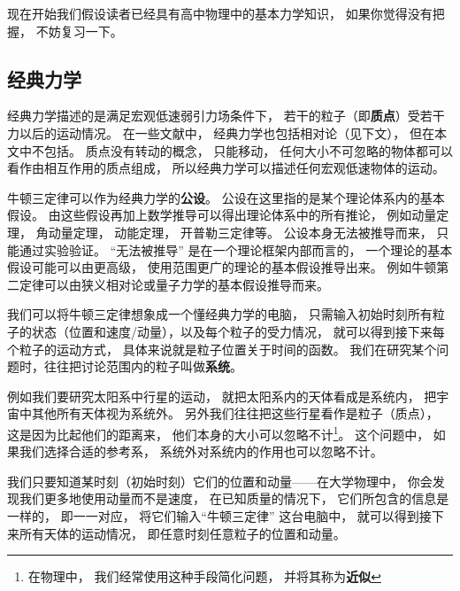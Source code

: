 
\begin{issues}
\issueTODO
\end{issues}


现在开始我们假设读者已经具有高中物理中的基本力学知识， 如果你觉得没有把握， 不妨复习一下。

\subsection{经典力学}
经典力学描述的是满足宏观低速弱引力场条件下， 若干的粒子（即\textbf{质点}）受若干力以后的运动情况。 在一些文献中， 经典力学也包括相对论（见下文）， 但在本文中不包括。 质点没有转动的概念， 只能移动， 任何大小不可忽略的物体都可以看作由相互作用的质点组成， 所以经典力学可以描述任何宏观低速物体的运动。

牛顿三定律可以作为经典力学的\textbf{公设}。 公设在这里指的是某个理论体系内的基本假设。 由这些假设再加上数学推导可以得出理论体系中的所有推论， 例如动量定理， 角动量定理， 动能定理， 开普勒三定律等。 公设本身无法被推导而来， 只能通过实验验证。 “无法被推导” 是在一个理论框架内部而言的， 一个理论的基本假设可能可以由更高级， 使用范围更广的理论的基本假设推导出来。 例如牛顿第二定律可以由狭义相对论或量子力学的基本假设推导而来。

我们可以将牛顿三定律想象成一个懂经典力学的电脑， 只需输入初始时刻所有粒子的状态（位置和速度/动量），以及每个粒子的受力情况， 就可以得到接下来每个粒子的运动方式， 具体来说就是粒子位置关于时间的函数。 我们在研究某个问题时，往往把讨论范围内的粒子叫做\textbf{系统}。

例如我们要研究太阳系中行星的运动， 就把太阳系内的天体看成是系统内， 把宇宙中其他所有天体视为系统外。 另外我们往往把这些行星看作是粒子（质点）， 这是因为比起他们的距离来， 他们本身的大小可以忽略不计\footnote{在物理中， 我们经常使用这种手段简化问题， 并将其称为\textbf{近似}}。 这个问题中， 如果我们选择合适的参考系， 系统外对系统内的作用也可以忽略不计。

我们只要知道某时刻（初始时刻）它们的位置和动量——在大学物理中， 你会发现我们更多地使用动量而不是速度， 在已知质量的情况下， 它们所包含的信息是一样的， 即一一对应， 将它们输入“牛顿三定律” 这台电脑中， 就可以得到接下来所有天体的运动情况， 即任意时刻任意粒子的位置和动量。


